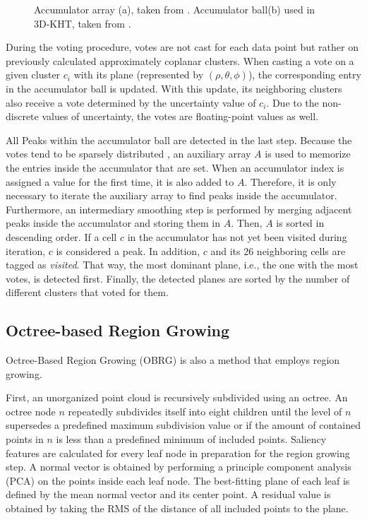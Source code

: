 \documentclass[main.tex]{subfiles}
\begin{document}
\begin{figure}[H]
\begin{subfigure}{0.25\textwidth}
        \caption[3D-KHT Accumulator Ball]{}
        \label{fig:accball}
    \end{subfigure}
    \hspace{\fill}
    \caption[Hough Transform Accumulators]{Accumulator array (a), taken from \cite*[Figure~3]{Borrmann_Elseberg_Lingemann_Nüchter_2011}. Accumulator
        ball(b) used in 3D-KHT, taken from \cite*[Figure~5]{Limberger_Oliveira_2015}.}
\end{figure}

During the voting procedure, votes are not cast for each data point but rather on previously calculated approximately coplanar clusters.
When casting a vote on a given cluster $c_i$ with its plane (represented by $(\rho, \theta, \phi)$), the corresponding entry in the accumulator ball is updated.
With this update, its neighboring clusters also receive a vote determined by the uncertainty value of $c_i$. Due to the non-discrete
values of uncertainty, the votes are floating-point values as well.

All Peaks within the accumulator ball are detected in the last step. Because the votes tend to be sparsely distributed \cite[Section~3.4]{Limberger_Oliveira_2015},
an auxiliary array $A$ is used to memorize the entries inside the accumulator that are set. When an accumulator index is assigned a value for the first time, it is also added to $A$.
Therefore, it is only necessary to iterate the auxiliary array to find peaks inside the accumulator.
Furthermore, an intermediary smoothing step is performed by merging adjacent peaks inside the accumulator and storing them in $A$.
Then, $A$ is sorted in descending order.
If a cell $c$ in the accumulator has not yet been visited during iteration, $c$ is considered a peak. In addition, $c$ and its 26 neighboring cells are tagged as \textit{visited}.
That way, the most dominant plane, i.e., the one with the most votes, is detected first.
Finally, the detected planes are sorted by the number of different clusters that voted for them.

\subsection{Octree-based Region Growing} \label{sec:bg-obrg}
Octree-Based Region Growing (OBRG) \cite{Vo_Truong-Hong_Laefer_Bertolotto_2015} is also a method that employs region growing.

First, an unorganized point cloud is recursively subdivided using an octree.
An octree node $n$ repeatedly subdivides itself into eight children until the level of $n$ supersedes a predefined maximum subdivision value or if the
amount of contained points in $n$ is less than a predefined minimum of included points.
Saliency features are calculated for every leaf node in preparation for the region growing step. A normal vector is obtained by performing a principle
component analysis (PCA) on the points inside each leaf node. The best-fitting plane of each leaf is defined by the mean normal vector and its center point.
A residual value is obtained by taking the RMS of the distance of all included points to the plane.
\end{document}
